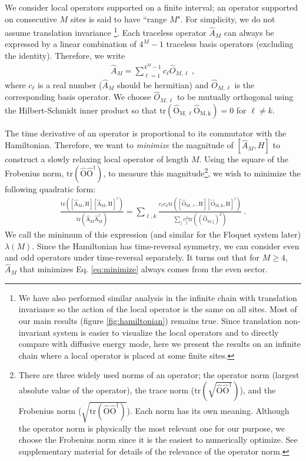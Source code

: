 \documentclass[twocolumn,superscriptaddress, prb]{revtex4-1}
\begin{document}
We consider local operators supported on a finite interval; an operator supported on consecutive $M$ sites is said to have ``range $M$".
For simplicity, we do not assume translation invariance
\footnote{We have also performed similar analysis in the infinite chain with translation invariance so the action of the local operator is the same on all sites. Most of our main results (figure \ref{fig:hamiltonian})
remains true. Since translation non-invariant system is easier to visualize the local operators and to directly compare with diffusive energy mode, here we present the results on an infinite chain where a local operator is placed at some finite sites.}.
Each traceless operator
$\hat{A}_M$ can always be expressed by a linear combination of $4^M - 1$ traceless basis operators (excluding the identity).
Therefore, we write
\begin{align}
\hat{A}_M = \sum_{\ell = 1}^{4^M - 1} c_\ell \hat{O}_{M,\ell} ~,
\end{align}
where $c_\ell$ is a real number ($\hat{A}_M$ should be hermitian) and $\hat{O}_{M,\ell}$ is the corresponding basis operator.
We choose $\hat{O}_{M,\ell}$ to be mutually orthogonal using the Hilbert-Schmidt inner product so that
$\mathrm{tr(\hat{O}_{M,\ell} \hat{O}_{M,k})} = 0$ for $\ell\neq k$.

The time derivative of an operator is proportional to its commutator with the Hamiltonian.
Therefore, we want to {\it minimize} the magnitude of $[\hat{A}_M, H]$
to construct a slowly relaxing local operator of length $M$.
Using the square of the Frobenius norm, $\mathrm{tr(\hat{O}\hat{O}^\dag)}$, to measure this magnitude\footnote{There are three widely used norms of an operator;
the operator norm (largest absolute value of the operator), the trace norm ($\mathrm{tr(\sqrt{\hat{O}\hat{O}^\dag})}$),
and the Frobenius norm ($\sqrt{\mathrm{tr(\hat{O}\hat{O}^\dag)}}$). Each norm has its own meaning.
Although the operator norm is physically the most relevant one for our purpose,
we choose the Frobenius norm since it is the easiest to numerically optimize.
See supplementary material for details of the relevance of the operator norm.},
we wish to minimize the following quadratic form:
\begin{align}\label{eq:minimize}
\frac{\mathrm{tr([\hat{A}_M,H][\hat{A}_M,H]^\dag)}}{\mathrm{tr(\hat{A}_M\hat{A}^\dag_M)}} = \sum_{\ell,k}\frac{c_\ell c_k \mathrm{tr([\hat{O}_{M,\ell},H][\hat{O}_{M,k},H]^\dag)}}{\sum_j c_j ^2 \mathrm{tr((\hat{O}_{M,j})^2)}} ~.
\end{align}
We call the minimum of this expression (and similar for the Floquet system later) $\lambda(M)$.
Since the Hamiltonian has time-reversal symmetry,
we can consider even and odd operators under time-reversal separately.
It turns out that for $M\geq 4$, $\hat{A}_M$ that minimizes Eq. \eqref{eq:minimize} always comes from the even sector.
\end{document}
